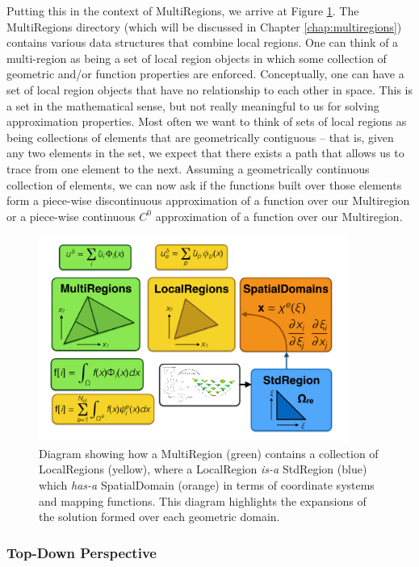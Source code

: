 Putting this in the context of MultiRegions, we arrive at Figure \ref{intro:structure1}.  The MultiRegions directory (which will be discussed in Chapter \ref{chap:multiregions}) contains various data structures that combine
local regions.  One can think of a multi-region as being a set of local region objects in which some collection of geometric and/or function properties are enforced.
Conceptually, one can have a set of local region objects that have no relationship to each other in space.   This is a set in the mathematical sense, but not really
meaningful to us for solving approximation properties.  Most often we want to think of sets of local regions as being collections of elements that are geometrically
contiguous -- that is, given any two elements in the set, we expect that there exists a path that allows us to trace from one element to the next.   Assuming
a geometrically continuous collection of elements, we can now ask if the functions built over those elements form a piece-wise discontinuous approximation
of a function over our Multiregion or a piece-wise continuous $C^0$ approximation of a function over our Multiregion.

\begin{figure}[htb]
\centering
\includegraphics[width=4in]{img/structure1.png}
\caption{Diagram showing how a MultiRegion (green) contains a collection of LocalRegions (yellow), where a LocalRegion {\em is-a} StdRegion (blue) which {\em has-a} SpatialDomain (orange) in terms of coordinate systems and mapping functions.  This diagram highlights the expansions of the solution formed over each geometric domain.}
\label{intro:structure1}
\end{figure}


\subsubsection{Top-Down Perspective}

